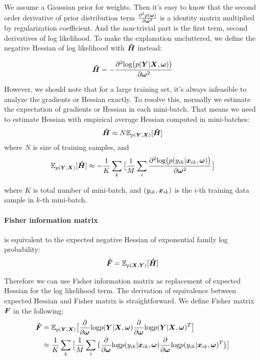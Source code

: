 We assume a Gaussian prior for weights. Then it's easy to know that the second order derivative of prior distribution term $\frac{\partial^2p(\boldsymbol \omega)}{\partial\boldsymbol \omega^2}$ is a identity matrix multiplied by regularization coefficient. And the non-trivial part is the first term, second derivatives of log likelihood. To make the explanation uncluttered, we define the negative Hessian of log likelihood with $\boldsymbol{\hat{H}}$ instead:

\[
\boldsymbol{\hat{H}} = -\frac{\partial^2\text{log}\big(p(\boldsymbol Y|\boldsymbol X, \boldsymbol \omega)\big)}{\partial \boldsymbol \omega^2}
\] 

However, we should note that for a large training set, it's always infeasible to analyze the gradients or Hessian exactly. To resolve this, normally we estimate the expectation of gradients or Hessian in each mini-batch. That means we need to estimate Hessian with empirical average Hessian computed in mini-batches:
\[
\boldsymbol{\hat H} \approx N\mathbb E_{p(\boldsymbol Y, \boldsymbol X)}[\boldsymbol{\hat{H}}]
\]
where $N$ is size of training samples, and 
\begin{equation} \label{expected hessian}
\mathbb E_{p(\boldsymbol Y, \boldsymbol X)}[\boldsymbol{\hat{H}}] \approx -\frac{1}{K}\sum_{k}\big[\frac{1}{M}\sum_{i}\frac{\partial^2\text{log}\big(p(y_{ik}|\boldsymbol x_{ik}, \boldsymbol \omega)\big)}{\partial \boldsymbol \omega^2}\big]
\end{equation}

where $K$ is total number of mini-batch, and $(y_{ik}, \boldsymbol x_{ik})$ is the $i$-th training data sample in $k$-th mini-batch. 

\paragraph{Fisher information matrix} is equivalent to the expected negative Hessian of exponential family log probability:
\[
\boldsymbol{\hat{F}} = \mathbb E_{p(\boldsymbol X, \boldsymbol Y)}[\boldsymbol{\hat{H}}]
\]

Therefore we can use Fisher information matrix as replacement of expected Hessian for the log likelihood term. The derivation of equivalence between expected Hessian and Fisher matrix is straightforward. We define Fisher matrix $\boldsymbol F$ in the following:
\begin{equation}
\begin{aligned}\label{Fisher}
\boldsymbol{\hat{F}} &= \mathbb E_{p(\boldsymbol Y, \boldsymbol X)}\big[\frac{\partial}{\partial \boldsymbol \omega}\text{log}p(\boldsymbol Y|\boldsymbol X,\boldsymbol \omega)\frac{\partial}{\partial \boldsymbol \omega}\text{log}p(\boldsymbol Y|\boldsymbol X,\boldsymbol \omega)^T\big] \\
&\approx \frac{1}{K}\sum_{k}\big[\frac{1}{M}\sum_{i}
\big(\frac{\partial}{\partial \boldsymbol \omega}\text{log}p(y_{ik}|\boldsymbol x_{ik},\boldsymbol \omega)\frac{\partial}{\partial \boldsymbol \omega}\text{log}p(y_{ik}|\boldsymbol x_{ik},\boldsymbol \omega)^T\big)\big]
\end{aligned}
\end{equation}


